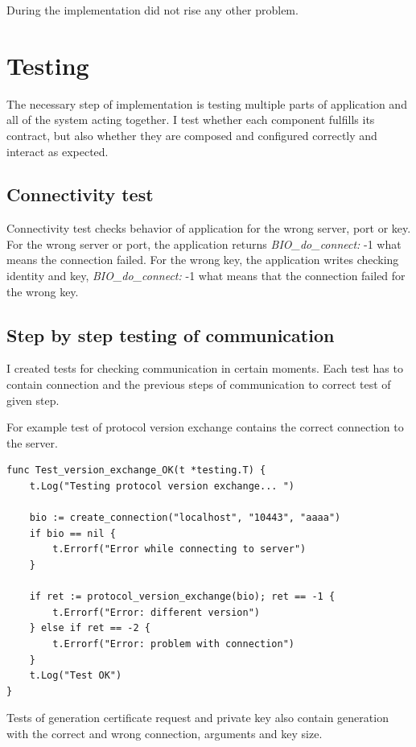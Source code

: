 \documentclass[
  digital, %
  notable,   %
  lof,     %
  lot,     %
]{fithesis3}
\begin{document}
During the implementation did not rise any other problem.

\section{Testing}

The necessary step of implementation is testing multiple parts of application and all of the 
system acting together. I test whether each component fulfills its contract, but also whether they 
are composed and configured correctly and interact as expected. 

\subsection{Connectivity test}

Connectivity test checks behavior of application for the wrong server, port or key. For the wrong 
server or port, the application returns \textit{BIO\_do\_connect:} -1 what means the connection 
failed. For the wrong key, the application writes checking identity and key, 
\textit{BIO\_do\_connect:} -1 what means that the connection failed for the wrong key.

\subsection{Step by step testing of communication}

I created tests for checking communication in certain moments. Each test has to contain connection 
and the previous steps of communication to correct test of given step.

For example test of protocol version exchange contains the correct connection to the server.
\begin{lstlisting}
func Test_version_exchange_OK(t *testing.T) {
	t.Log("Testing protocol version exchange... ")
		
	bio := create_connection("localhost", "10443", "aaaa")
	if bio == nil {
		t.Errorf("Error while connecting to server")
	}
	
	if ret := protocol_version_exchange(bio); ret == -1 {
		t.Errorf("Error: different version")
	} else if ret == -2 {
		t.Errorf("Error: problem with connection")
	} 
	t.Log("Test OK")
}
\end{lstlisting}

Tests of generation certificate request and private key also contain generation with the correct 
and wrong connection, arguments and key size.
\end{document}
